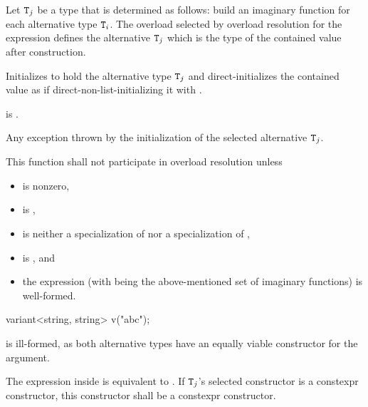 \begin{itemdescr}
\pnum
Let $\texttt{T}_j$ be a type that is determined as follows:
build an imaginary function  for each alternative type $\texttt{T}_i$. The overload  selected by overload
resolution for the expression  defines
the alternative $\texttt{T}_j$ which is the type of the contained value after
construction.

\pnum
\effects
Initializes  to hold the alternative type $\texttt{T}_j$ and
direct-initializes the contained value as if direct-non-list-initializing it
with .

\pnum
\postconditions
{} is .

\pnum
\throws
Any exception thrown by the initialization of the selected alternative $\texttt{T}_j$.

\pnum
\remarks
This function shall not participate in overload resolution unless
\begin{itemize}
\item
   is nonzero,

\item
   is ,

\item
   is neither a specialization
  of  nor a specialization
  of ,

\item
   is , and

\item
  the expression \brk{}
  (with  being the above-mentioned set of
  imaginary functions) is well-formed.
\end{itemize}

\pnum
\begin{note}
\begin{codeblock}
variant<string, string> v("abc");
\end{codeblock}
is ill-formed, as both alternative types have an equally viable constructor
for the argument. \end{note}

\pnum
The expression inside  is equivalent to
.
If $\texttt{T}_j$'s selected constructor is a constexpr constructor,
this constructor shall be a constexpr constructor.
\end{itemdescr}

